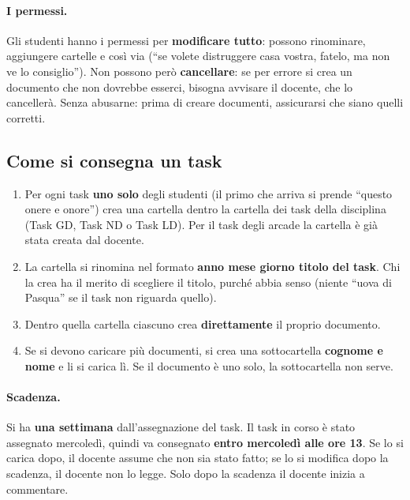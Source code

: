 \paragraph{I permessi.} Gli studenti hanno i permessi per \textbf{modificare
tutto}: possono rinominare, aggiungere cartelle e così via (``se volete
distruggere casa vostra, fatelo, ma non ve lo consiglio''). Non possono però
\textbf{cancellare}: se per errore si crea un documento che non dovrebbe
esserci, bisogna avvisare il docente, che lo cancellerà. Senza abusarne:
prima di creare documenti, assicurarsi che siano quelli corretti.

\subsection{Come si consegna un task}

\begin{enumerate}
  \item Per ogni task \textbf{uno solo} degli studenti (il primo che arriva si
        prende ``questo onere e onore'') crea una cartella dentro la cartella
        dei task della disciplina (Task GD, Task ND o Task LD). Per il task
        degli arcade la cartella è già stata creata dal docente.
  \item La cartella si rinomina nel formato \textbf{anno mese giorno titolo
        del task}. Chi la crea ha il merito di scegliere il titolo, purché
        abbia senso (niente ``uova di Pasqua'' se il task non riguarda quello).
  \item Dentro quella cartella ciascuno crea \textbf{direttamente} il proprio
        documento.
  \item Se si devono caricare più documenti, si crea una sottocartella
        \textbf{cognome e nome} e li si carica lì. Se il documento è uno solo,
        la sottocartella non serve.
\end{enumerate}

\paragraph{Scadenza.} Si ha \textbf{una settimana} dall'assegnazione del
task. Il task in corso è stato assegnato mercoledì, quindi va consegnato
\textbf{entro mercoledì alle ore 13}. Se lo si carica dopo, il docente assume
che non sia stato fatto; se lo si modifica dopo la scadenza, il docente non lo
legge. Solo dopo la scadenza il docente inizia a commentare.


